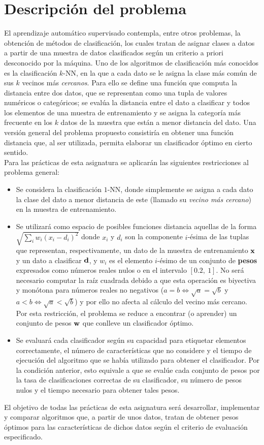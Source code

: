\section{Descripción del problema}

El aprendizaje automático supervisado contempla, entre otros problemas, la obtención de métodos de clasificación, los cuales tratan de asignar clases a datos a partir de una muestra de datos clasificados según un criterio a priori desconocido por la máquina. Uno de los algoritmos de clasificación más conocidos es la clasificación $k$-NN, en la que a cada dato se le asigna la clase más común de sus $k$ vecinos más \textit{cercanos}. Para ello se define una función que computa la distancia entre dos datos, que se representan como una tupla de valores numéricos o categóricos; se evalúa la distancia entre el dato a clasificar y todos los elementos de una muestra de entrenamiento y se asigna la categoría más frecuente en los $k$ datos de la muestra que están a menor distancia del dato. Una versión general del problema propuesto consistiría en obtener una función distancia que, al ser utilizada, permita elaborar un clasificador óptimo en cierto sentido. \\

Para las prácticas de esta asignatura se aplicarán las siguientes restricciones al problema general:
\begin{itemize}
  \item Se considera la clasificación $1$-NN, donde simplemente se asigna a cada dato la clase del dato a menor distancia de este (llamado su \textit{vecino más cercano}) en la muestra de entrenamiento.
  \item Se utilizará como espacio de posibles funciones distancia aquellas de la forma $\sqrt{\sum_i w_i (x_i - d_i)^2}$ donde $x_i$ y $d_i$ son la componente $i$-ésima de las tuplas que representan, respectivamente, un dato de la muestra de entrenamiento $\normalfont \textbf x$ y un dato a clasificar $\normalfont \textbf d$, y $w_i$ es el elemento $i$-ésimo de un conjunto de \textbf{pesos} expresados como números reales nulos o en el intervalo $[0.2,\ 1]$. No será necesario computar la raíz cuadrada debido a que esta operación es biyectiva y monótona para números reales no negativos ($a = b \Leftrightarrow \sqrt a = \sqrt b$ y $a < b \Leftrightarrow \sqrt a < \sqrt b$) y por ello no afecta al cálculo del vecino más cercano. Por esta restricción, el problema se reduce a encontrar (o aprender) un conjunto de pesos $\normalfont \textbf w$ que conlleve un clasificador óptimo.
  \item Se evaluará cada clasificador según su capacidad para etiquetar elementos correctamente, el número de características que no considere y el tiempo de ejecución del algoritmo que se había utilizado para obtener el clasificador. Por la condición anterior, esto equivale a que se evalúe cada conjunto de pesos por la tasa de clasificaciones correctas de su clasificador, su número de pesos nulos y el tiempo necesario para obtener tales pesos.
\end{itemize}

El objetivo de todas las prácticas de esta asignatura será desarrollar, implementar y comparar algoritmos que, a partir de unos datos, tratan de obtener pesos óptimos para las características de dichos datos según el criterio de evaluación especificado.

